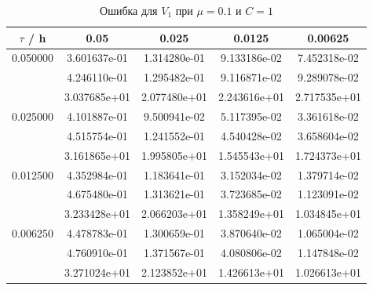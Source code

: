 \documentclass[specialist,subf,href,colorlinks=true,12pt
,times,mtpro,specialist
]{disser}
\begin{document}
\begin{table}[H]
\small
\caption{Ошибка для $V_1$ при $\mu=0.1$ и $C = 1$}
\begin{center}
\begin{tabular}{|c|c|c|c|c|}
\hline
$\tau$ / h & 0.05 & 0.025 & 0.0125 & 0.00625 \\
\hline
0.050000 & 3.601637e-01  & 1.314280e-01  & 9.133186e-02  & 7.452318e-02 \\
 & 4.246110e-01  & 1.295482e-01  & 9.116871e-02  & 9.289078e-02 \\
 & 3.037685e+01  & 2.077480e+01  & 2.243616e+01  & 2.717535e+01 \\
\hline
0.025000 & 4.101887e-01  & 9.500941e-02  & 5.117395e-02  & 3.361618e-02 \\
 & 4.515754e-01  & 1.241552e-01  & 4.540428e-02  & 3.658604e-02 \\
 & 3.161865e+01  & 1.995805e+01  & 1.545543e+01  & 1.724373e+01 \\
\hline
0.012500 & 4.352984e-01  & 1.183641e-01  & 3.152034e-02  & 1.379714e-02 \\
 & 4.675480e-01  & 1.313621e-01  & 3.723685e-02  & 1.123091e-02 \\
 & 3.233428e+01  & 2.066203e+01  & 1.358249e+01  & 1.034845e+01 \\
\hline
0.006250 & 4.478783e-01  & 1.300659e-01  & 3.870640e-02  & 1.065004e-02 \\
 & 4.760910e-01  & 1.371567e-01  & 4.080806e-02  & 1.147848e-02 \\
 & 3.271024e+01  & 2.123852e+01  & 1.426613e+01  & 1.026613e+01 \\
\hline
\end{tabular}
\end{center}
\end{table}
\end{document}
